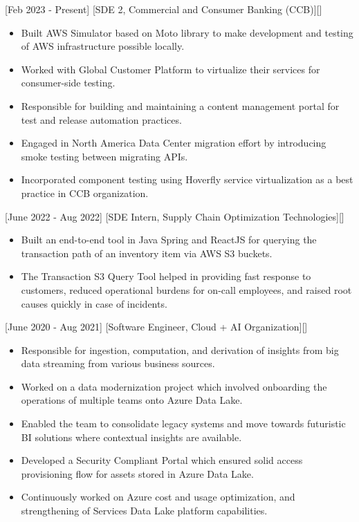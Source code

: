 \documentclass{article}
\begin{document}
[Feb 2023 - Present]
[SDE 2, Commercial and Consumer Banking (CCB)][]

\begin{itemize}
\item Built AWS Simulator based on Moto library to make development and testing of AWS infrastructure possible locally.
\item Worked with Global Customer Platform to virtualize their services for consumer-side testing.
\item Responsible for building and maintaining a content management portal for test and release automation practices.
\item Engaged in North America Data Center migration effort by introducing smoke testing between migrating APIs.
\item Incorporated component testing using Hoverfly service virtualization as a best practice in CCB organization.
\end{itemize}

[June 2022 - Aug 2022]
[SDE Intern, Supply Chain Optimization Technologies][]

\begin{itemize}
\item Built an end-to-end tool in Java Spring and ReactJS for querying the transaction path of an inventory item via AWS S3 buckets.
\item The Transaction S3 Query Tool helped in providing fast response to customers, reduced operational burdens for on-call employees, and raised root causes quickly in case of incidents.

\end{itemize}

[June 2020 - Aug 2021]
[Software Engineer, Cloud + AI Organization][]

\begin{itemize}
\item Responsible for ingestion, computation, and derivation of insights from big data streaming from various business sources.
\item Worked on a data modernization project which involved onboarding the operations of multiple teams onto Azure Data Lake.
\item Enabled the team to consolidate legacy systems and move towards futuristic BI solutions where contextual insights are available. 
\item Developed a Security Compliant Portal which ensured solid access provisioning flow for assets stored in Azure Data Lake.
\item Continuously worked on Azure cost and usage optimization, and strengthening of Services Data Lake platform capabilities.
\end{itemize}
\end{document}

